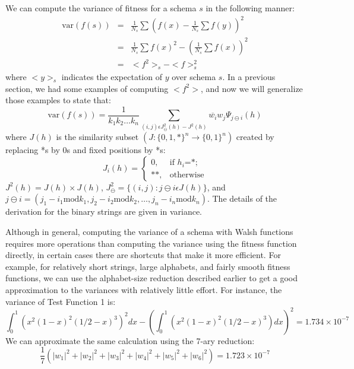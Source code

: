 We can compute the variance of fitness for a schema $s$ in the following
manner:
\begin{eqnarray}
\mbox{var}(f(s))&=&\frac{1}{N_s} \sum{\left(f(x)-\frac{1}{N_s}
	\sum{f(y)}\right)^2}\nonumber\\
&=& \frac{1}{N_s} \sum{f(x)^2} -\left(\frac{1}{N_s} \sum{f(x)}\right)^2
	\nonumber\\
&=& <f^2>_s-<f>_s^2
\end{eqnarray}
where $<y>_s$ indicates the expectation of $y$ over schema $s$.
In a previous section, we had some examples of computing $<f^2>$, and
now we will generalize those examples to state that:
\begin{equation}
\mbox{var}(f(s))=\frac{1}{k_1 k_2 \ldots k_n}\sum_{(i,j) \epsilon J^2_{\ominus}(h)-J^2(h)}{
	\overline{w_i} w_j \Psi_{j \ominus i}(h)}
\end{equation}
where $J(h)$ is the similarity subset $(J:\{0,1,*\}^n \rightarrow \{0,1\}^n)$
created by replacing *s by 0s and fixed positions by *s:
\begin{equation}
J_i(h)=\left\{\begin{array}{ll}
	0,&\mbox{if $h_i$=*;}\\
	**,&\mbox{otherwise}
	\end{array}\right.
\end{equation}
$J^2(h)=J(h) \times J(h)$, $J^2_{\ominus}=\{(i,j):j\ominus i \epsilon J(h)
\}$, and $j \ominus i=(j_1-i_1 \mbox{mod} k_1,j_2-i_2 \mbox{mod} k_2,\ldots,
	j_n-i_n \mbox{mod} k_n)$.
The details of the derivation for the binary strings are given in {variance}.

Although in general, computing the variance of a schema with Walsh functions
requires more operations than computing the variance using the fitness
function directly, in certain cases there are shortcuts that make it more
efficient.  For example, for relatively short strings, large alphabets,
and fairly smooth fitness functions, we can use the alphabet-size reduction
described earlier to get a good approximation to the variances with
relatively little effort.  For instance, the variance of Test Function 1 is:
\begin{equation}
\int_0^1{(x^2 (1-x)^2 (1/2-x)^3)^2 dx}-\left(\int_0^1{(x^2(1-x)^2(1/2-x)^3) dx}
	\right)^2=1.734\times 10^{-7}
\end{equation}
We can approximate the same calculation using the 7-ary reduction:
\begin{equation}
\frac{1}{7}(|w_1|^2+|w_2|^2+|w_3|^2+|w_4|^2+|w_5|^2+|w_6|^2)=1.723\times 10^{-7}
\end{equation}

